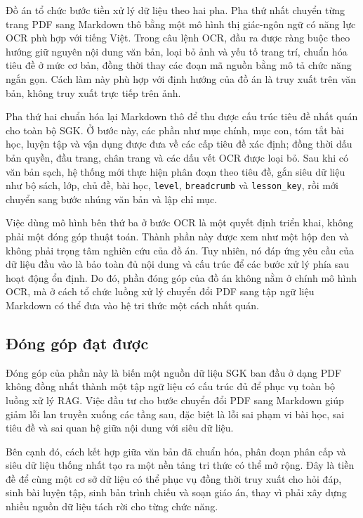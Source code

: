 \documentclass[../DoAn.tex]{subfiles}
\begin{document}
Đồ án tổ chức bước tiền xử lý dữ liệu theo hai pha. Pha thứ nhất chuyển từng trang PDF sang Markdown thô bằng một mô hình thị giác-ngôn ngữ có năng lực OCR phù hợp với tiếng Việt. Trong câu lệnh OCR, đầu ra được ràng buộc theo hướng giữ nguyên nội dung văn bản, loại bỏ ảnh và yếu tố trang trí, chuẩn hóa tiêu đề ở mức cơ bản, đồng thời thay các đoạn mã nguồn bằng mô tả chức năng ngắn gọn. Cách làm này phù hợp với định hướng của đồ án là truy xuất trên văn bản, không truy xuất trực tiếp trên ảnh.

Pha thứ hai chuẩn hóa lại Markdown thô để thu được cấu trúc tiêu đề nhất quán cho toàn bộ SGK. Ở bước này, các phần như mục chính, mục con, tóm tắt bài học, luyện tập và vận dụng được đưa về các cấp tiêu đề xác định; đồng thời dấu bản quyền, đầu trang, chân trang và các dấu vết OCR được loại bỏ. Sau khi có văn bản sạch, hệ thống mới thực hiện phân đoạn theo tiêu đề, gắn siêu dữ liệu như bộ sách, lớp, chủ đề, bài học, \texttt{level}, \texttt{breadcrumb} và \texttt{lesson\_key}, rồi mới chuyển sang bước nhúng văn bản và lập chỉ mục.

Việc dùng mô hình bên thứ ba ở bước OCR là một quyết định triển khai, không phải một đóng góp thuật toán. Thành phần này được xem như một hộp đen và không phải trọng tâm nghiên cứu của đồ án. Tuy nhiên, nó đáp ứng yêu cầu của dữ liệu đầu vào là bảo toàn đủ nội dung và cấu trúc để các bước xử lý phía sau hoạt động ổn định. Do đó, phần đóng góp của đồ án không nằm ở chính mô hình OCR, mà ở cách tổ chức luồng xử lý chuyển đổi PDF sang tập ngữ liệu Markdown có thể đưa vào hệ tri thức một cách nhất quán.

\subsection{Đóng góp đạt được}

Đóng góp của phần này là biến một nguồn dữ liệu SGK ban đầu ở dạng PDF không đồng nhất thành một tập ngữ liệu có cấu trúc đủ để phục vụ toàn bộ luồng xử lý RAG. Việc đầu tư cho bước chuyển đổi PDF sang Markdown giúp giảm lỗi lan truyền xuống các tầng sau, đặc biệt là lỗi sai phạm vi bài học, sai tiêu đề và sai quan hệ giữa nội dung với siêu dữ liệu.

Bên cạnh đó, cách kết hợp giữa văn bản đã chuẩn hóa, phân đoạn phân cấp và siêu dữ liệu thống nhất tạo ra một nền tảng tri thức có thể mở rộng. Đây là tiền đề để cùng một cơ sở dữ liệu có thể phục vụ đồng thời truy xuất cho hỏi đáp, sinh bài luyện tập, sinh bản trình chiếu và soạn giáo án, thay vì phải xây dựng nhiều nguồn dữ liệu tách rời cho từng chức năng.
\end{document}
